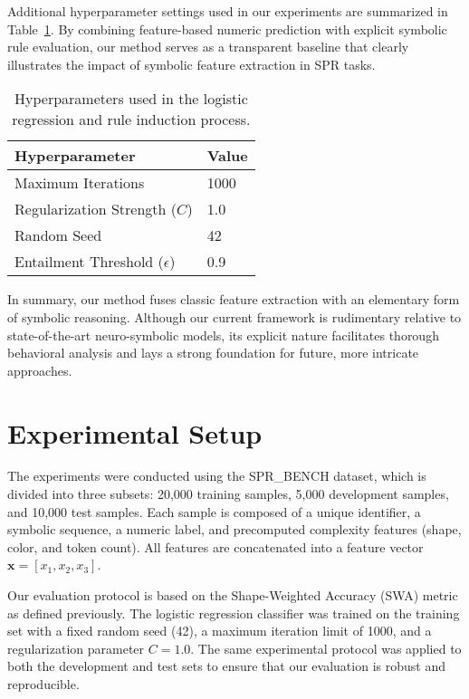 \documentclass{article}
\begin{document}
Additional hyperparameter settings used in our experiments are summarized in Table~\ref{tab:hyperparams}. By combining feature-based numeric prediction with explicit symbolic rule evaluation, our method serves as a transparent baseline that clearly illustrates the impact of symbolic feature extraction in SPR tasks.

\begin{table}[h]
\centering
\begin{tabular}{|l|l|}
\hline
\textbf{Hyperparameter} & \textbf{Value} \\ \hline
Maximum Iterations & 1000 \\
Regularization Strength (\(C\)) & 1.0 \\
Random Seed & 42 \\
Entailment Threshold (\(\epsilon\)) & 0.9 \\ \hline
\end{tabular}
\caption{Hyperparameters used in the logistic regression and rule induction process.}
\label{tab:hyperparams}
\end{table}

In summary, our method fuses classic feature extraction with an elementary form of symbolic reasoning. Although our current framework is rudimentary relative to state-of-the-art neuro-symbolic models, its explicit nature facilitates thorough behavioral analysis and lays a strong foundation for future, more intricate approaches.

\section{Experimental Setup}
The experiments were conducted using the SPR\_BENCH dataset, which is divided into three subsets: 20,000 training samples, 5,000 development samples, and 10,000 test samples. Each sample is composed of a unique identifier, a symbolic sequence, a numeric label, and precomputed complexity features (shape, color, and token count). All features are concatenated into a feature vector \(\mathbf{x} = [x_1, x_2, x_3]\).

Our evaluation protocol is based on the Shape-Weighted Accuracy (SWA) metric as defined previously. The logistic regression classifier was trained on the training set with a fixed random seed (42), a maximum iteration limit of 1000, and a regularization parameter \(C = 1.0\). The same experimental protocol was applied to both the development and test sets to ensure that our evaluation is robust and reproducible.
\end{document}
